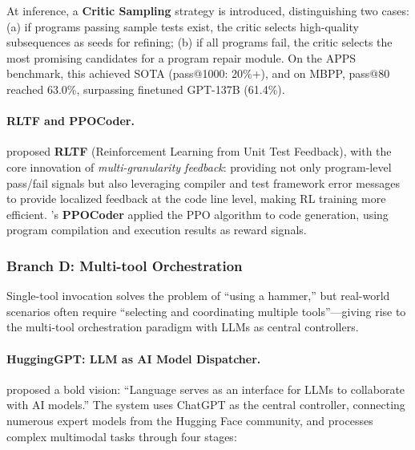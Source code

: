 At inference, a \textbf{Critic Sampling} strategy is introduced, distinguishing two cases: (a) if programs passing sample tests exist, the critic selects high-quality subsequences as seeds for refining; (b) if all programs fail, the critic selects the most promising candidates for a program repair module. On the APPS benchmark, this achieved SOTA (pass@1000: 20\%+), and on MBPP, pass@80 reached 63.0\%, surpassing finetuned GPT-137B (61.4\%).

\paragraph{RLTF and PPOCoder.}
\citet{liu2023rltf} proposed \textbf{RLTF} (Reinforcement Learning from Unit Test Feedback), with the core innovation of \emph{multi-granularity feedback}: providing not only program-level pass/fail signals but also leveraging compiler and test framework error messages to provide localized feedback at the code line level, making RL training more efficient. \citet{shojaee2023ppocoder}'s \textbf{PPOCoder} applied the PPO algorithm to code generation, using program compilation and execution results as reward signals.

\subsubsection{Branch D: Multi-tool Orchestration}

Single-tool invocation solves the problem of ``using a hammer,'' but real-world scenarios often require ``selecting and coordinating multiple tools''---giving rise to the multi-tool orchestration paradigm with LLMs as central controllers.

\paragraph{HuggingGPT: LLM as AI Model Dispatcher.}
 proposed a bold vision: ``Language serves as an interface for LLMs to collaborate with AI models.'' The system uses ChatGPT as the central controller, connecting numerous expert models from the Hugging Face community, and processes complex multimodal tasks through four stages:

